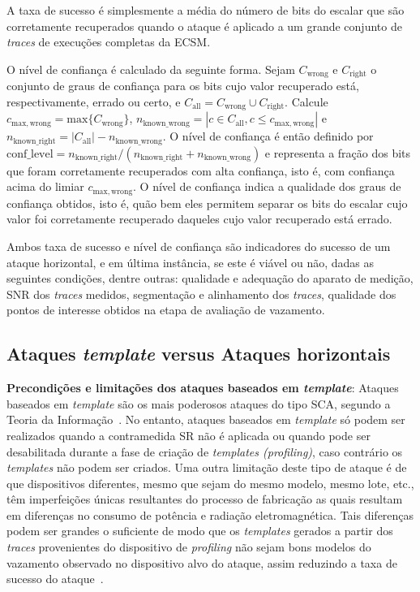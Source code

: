 \documentclass{SBCbookchapter}
\begin{document}
\begin{description}
A taxa de sucesso é simplesmente a média do número de bits do escalar que são corretamente recuperados quando o ataque é aplicado a um grande conjunto de \emph{traces} de execuções completas da ECSM.

O nível de confiança é calculado da seguinte forma. Sejam $C_\mathrm{wrong}$ e $C_\mathrm{right}$ o conjunto de graus de confiança para os bits cujo valor recuperado está, respectivamente, errado ou certo, e $C_\mathrm{all} = C_\mathrm{wrong} \cup C_\mathrm{right} $.
%
Calcule $c_\mathrm{max,wrong} = \mathrm{max}\{C_\mathrm{wrong}\}$, $n_\mathrm{known\_wrong} = |{c \in C_\mathrm{all}, c\leq c_\mathrm{max,wrong}}|$  e $n_\mathrm{known\_right} = |C_\mathrm{all}| - n_\mathrm{known\_wrong}$.
%
O nível de confiança é então definido por $\mathrm{conf\_level} = n_\mathrm{known\_right} / (n_\mathrm{known\_right} + n_\mathrm{known\_wrong})$ e representa a fração dos bits que foram corretamente recuperados com alta confiança, isto é, com confiança acima do limiar $c_\mathrm{max,wrong}$.
%
O nível de confiança indica a qualidade dos graus de confiança obtidos, isto é, quão bem eles permitem separar os bits do escalar cujo valor foi corretamente recuperado daqueles cujo valor recuperado está errado. 

Ambos taxa de sucesso e nível de confiança são indicadores do sucesso de um ataque horizontal, e em última instância, se este é viável ou não, dadas as seguintes condições, dentre outras: qualidade e adequação do aparato de medição, SNR dos \emph{traces} medidos, segmentação e alinhamento dos \emph{traces}, qualidade dos pontos de interesse obtidos na etapa de avaliação de vazamento.
\end{description}

\subsection{Ataques \emph{template} versus Ataques horizontais}

\noindent \textbf{Precondições e limitações dos ataques baseados em \emph{template}}: Ataques baseados em \emph{template} são os mais poderosos ataques do tipo SCA, segundo a Teoria da Informação~\cite{ChariRaoRohatgi2003}. No entanto, ataques baseados em \emph{template} só podem ser realizados quando a contramedida SR não é aplicada ou quando pode ser desabilitada durante a fase de criação de \emph{templates (profiling)}, caso contrário os \emph{templates} não podem ser criados. Uma outra limitação deste tipo de ataque é de que dispositivos diferentes, mesmo que sejam do mesmo modelo, mesmo lote, etc., têm imperfeições únicas resultantes do processo de fabricação as quais resultam em diferenças no consumo de potência e radiação eletromagnética. Tais diferenças podem ser grandes o suficiente de modo que os \emph{templates} gerados a partir dos \emph{traces} provenientes do dispositivo de \emph{profiling} não sejam bons modelos do vazamento observado no dispositivo alvo do ataque, assim reduzindo a taxa de sucesso do ataque~\cite{ElaabidGuilley2012}.
\end{document}
